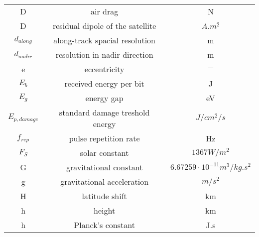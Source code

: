 \begin{center}
\begin{longtable}{c|c|c}
D																		& air drag 																																& N \\

D                                		& residual dipole of the satellite               													& $A.m^2$ \\

$d_{along}$                       	& along-track spacial resolution                  												& m \\

$d_{nadir}$                         & resolution in nadir direction                 													& m \\

e 																	& eccentricity 																														& $-$ \\

$E_b$                               & received energy per bit                  																& J \\

$E_g$                               & energy gap                                 															& eV \\

$E_{p,damage}$                      & standard damage treshold energy            															& $J/cm^2/s$ \\

$f_{rep}$                     			& pulse repetition rate                   																& Hz \\

$F_S$                           		& solar constant                            															& $1367 W/m^2$ \\

G                                   & gravitational constant                      														& $6.67259\cdot 10^{-11} m^3/{kg.s^2}$ \\

g 																	& gravitational acceleration 																							& $m/s^2$ \\

H                                   & latitude shift                            															& km \\

h                                   & height                                      														& km \\

h                                   & Planck's constant                           														& J.s \\


\end{longtable}
\end{center}
